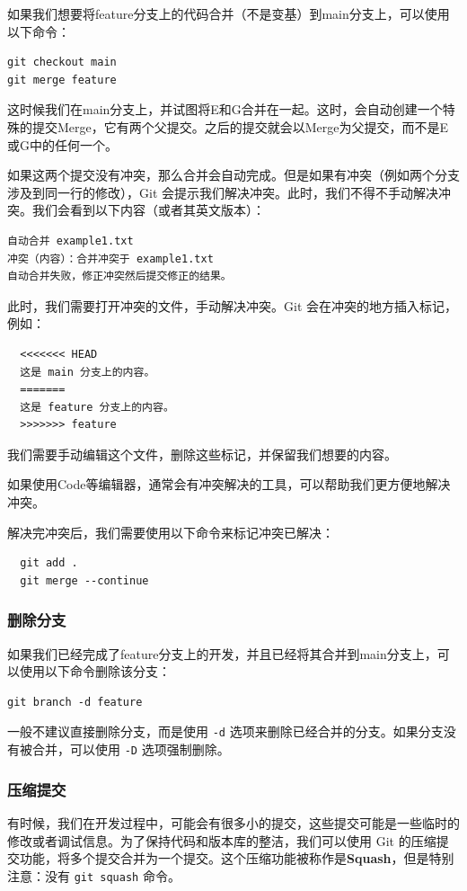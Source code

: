 \documentclass[fontset=none]{ctexart}
\begin{document}
如果我们想要将feature分支上的代码合并（不是变基）到main分支上，可以使用以下命令：

\begin{verbatim}
git checkout main
git merge feature
\end{verbatim}

这时候我们在main分支上，并试图将E和G合并在一起。这时，会自动创建一个特殊的提交Merge，它有两个父提交。之后的提交就会以Merge为父提交，而不是E或G中的任何一个。

如果这两个提交没有冲突，那么合并会自动完成。但是如果有冲突（例如两个分支涉及到同一行的修改），Git 会提示我们解决冲突。此时，我们不得不手动解决冲突。我们会看到以下内容（或者其英文版本）：
\begin{verbatim}
自动合并 example1.txt
冲突（内容）：合并冲突于 example1.txt
自动合并失败，修正冲突然后提交修正的结果。
\end{verbatim}
此时，我们需要打开冲突的文件，手动解决冲突。Git 会在冲突的地方插入标记，例如：
\begin{verbatim}
  <<<<<<< HEAD
  这是 main 分支上的内容。
  =======
  这是 feature 分支上的内容。
  >>>>>>> feature
\end{verbatim}
我们需要手动编辑这个文件，删除这些标记，并保留我们想要的内容。

如果使用Code等编辑器，通常会有冲突解决的工具，可以帮助我们更方便地解决冲突。

解决完冲突后，我们需要使用以下命令来标记冲突已解决：
\begin{verbatim}
  git add .
  git merge --continue
\end{verbatim}

\subsubsection{删除分支}

如果我们已经完成了feature分支上的开发，并且已经将其合并到main分支上，可以使用以下命令删除该分支：
\begin{verbatim}
git branch -d feature
\end{verbatim}

一般不建议直接删除分支，而是使用  \texttt{-d}  选项来删除已经合并的分支。如果分支没有被合并，可以使用  \texttt{-D}  选项强制删除。

\subsubsection{压缩提交}

有时候，我们在开发过程中，可能会有很多小的提交，这些提交可能是一些临时的修改或者调试信息。为了保持代码和版本库的整洁，我们可以使用 Git 的压缩提交功能，将多个提交合并为一个提交。这个压缩功能被称作是\textbf{Squash}，但是特别注意：没有 \texttt{git squash} 命令。
\end{document}
